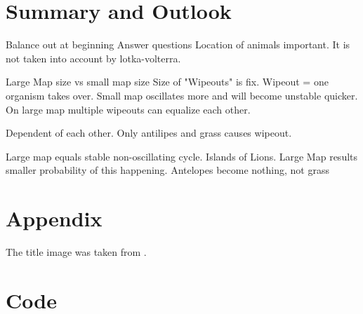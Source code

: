 \documentclass[11pt]{article}
\begin{document}
\section{Summary and Outlook}
Balance out at beginning
Answer questions
Location of animals important. It is not taken into account by lotka-volterra.

Large Map size vs small map size
Size of "Wipeouts" is fix. Wipeout = one organism takes over. Small map oscillates more and will become unstable quicker. On large map multiple wipeouts can equalize each other.

Dependent of each other. 
Only antilipes and grass causes wipeout.

Large map equals stable non-oscillating cycle. 
Islands of Lions. Large Map results smaller probability of this happening. 
Antelopes become nothing, not grass


\appendix

\section{Appendix}
The title image was taken from \cite{titleImage}.

\section{Code}



\end{document}
